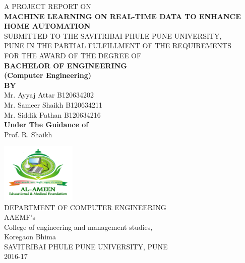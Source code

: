 \begin{titlepage}
\begin{center}
{\small A PROJECT REPORT ON}\\[\baselineskip]
\textbf{MACHINE LEARNING ON REAL-TIME DATA TO ENHANCE HOME AUTOMATION}\\[\baselineskip]

SUBMITTED TO THE SAVITRIBAI PHULE PUNE UNIVERSITY,\\
PUNE IN THE PARTIAL FULFILLMENT OF THE REQUIREMENTS\\
FOR THE AWARD OF THE DEGREE OF\\[2\baselineskip]


\textbf{BACHELOR OF ENGINEERING}\\
\textbf{(Computer Engineering)}\\[\baselineskip]

\textbf{BY}\\
Mr. Ayyaj Attar B120634202\\
Mr. Sameer Shaikh B120634211\\
Mr. Siddik Pathan B120634216\\[3\baselineskip]



\textbf{Under The Guidance of}\\[\baselineskip] 

Prof. R. Shaikh\\

\vfill

\includegraphics[width=0.27\textwidth]{./InitialPages/al_ameen-logo}\\[0.1in]
DEPARTMENT OF COMPUTER ENGINEERING\\
AAEMF's\\
College of engineering and management studies,\\
Koregaon Bhima\\
SAVITRIBAI PHULE PUNE UNIVERSITY, PUNE\\
2016-17

\end{center}

\end{titlepage}
